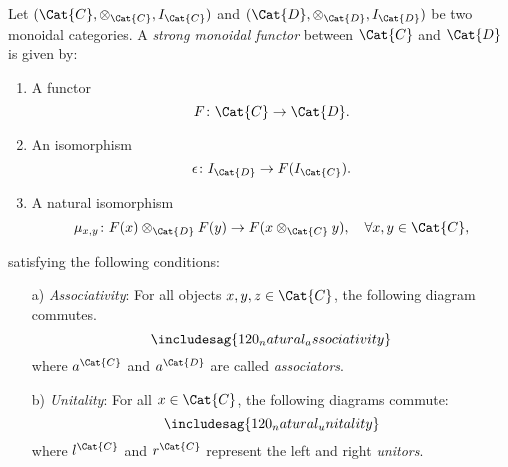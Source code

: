 \begin{shaded}
\begin{definition}
Let $(\Cat{C},\otimes_\Cat{C},I_\Cat{C})$ and $(\Cat{D},\otimes_\Cat{D},I_\Cat{D})$ be two monoidal categories. A \emph{strong monoidal functor} between $\Cat{C}$ and $\Cat{D}$ is given by:
\begin{enumerate}
    \item A functor 
    \begin{equation}
        F\colon \Cat{C}\to \Cat{D}.
    \end{equation}
    \item An isomorphism 
    \begin{equation}
        \epsilon\colon I_\Cat{D}\to F(I_\Cat{C}).
    \end{equation}
    \item A natural isomorphism
    \begin{equation}
        \mu_{x,y}\colon F(x)\otimes_\Cat{D} F(y) \to F(x\otimes_\Cat{C} y),\quad \forall x,y\in \Cat{C},
    \end{equation}
\end{enumerate}
satisfying the following conditions:
\begin{enumerate}
    \item[a)] \emph{Associativity}: For all objects $x,y,z\in \Cat{C}$, the following diagram commutes.
    \begin{equation}
        \includesag{120_natural_associativity}
    \end{equation}
    where $a^\Cat{C}$ and $a^\Cat{D}$ are called \emph{associators}.
    \item[b)] \emph{Unitality}: For all $x\in \Cat{C}$, the following diagrams commute:
    \begin{equation}
        \includesag{120_natural_unitality}
    \end{equation}
    where $l^\Cat{C}$ and $r^\Cat{C}$ represent the left and right \emph{unitors}.
\end{enumerate}
\end{definition}
\end{shaded}


